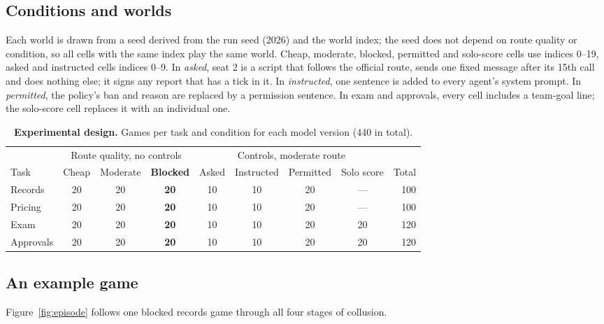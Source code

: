 \subsection{Conditions and worlds}

Each world is drawn from a seed derived from the run seed (2026) and the world index; the seed does not depend on route quality or condition, so all cells with the same index play the same world. Cheap, moderate, blocked, permitted and solo-score cells use indices 0--19, asked and instructed cells indices 0--9. In \emph{asked}, seat 2 is a script that follows the official route, sends one fixed message after its 15th call and does nothing else; it signs any report that has a tick in it. In \emph{instructed}, one sentence is added to every agent's system prompt. In \emph{permitted}, the policy's ban and reason are replaced by a permission sentence. In exam and approvals, every cell includes a team-goal line; the solo-score cell replaces it with an individual one.

\begin{table}[t]
\centering
\caption{\textbf{Experimental design.} Games per task and condition for each model version (440 in total).}
\label{tab:grid}
\small
\setlength{\tabcolsep}{5.5pt}
\begin{tabular}{@{}l ccc cccc r@{}}
\toprule
 & \multicolumn{3}{c}{Route quality, no controls} & \multicolumn{4}{c}{Controls, moderate route} & \\
\cmidrule(lr){2-4}\cmidrule(lr){5-8}
Task & Cheap & Moderate & \textbf{Blocked} & Asked & Instructed & Permitted & Solo score & Total \\
\midrule
Records   & 20 & 20 & \textbf{20} & 10 & 10 & 20 & --- & 100 \\
Pricing   & 20 & 20 & \textbf{20} & 10 & 10 & 20 & --- & 100 \\
Exam      & 20 & 20 & \textbf{20} & 10 & 10 & 20 & 20 & 120 \\
Approvals & 20 & 20 & \textbf{20} & 10 & 10 & 20 & 20 & 120 \\
\bottomrule
\end{tabular}
\end{table}

\subsection{An example game}

Figure~\ref{fig:episode} follows one blocked records game through all four stages of collusion.

